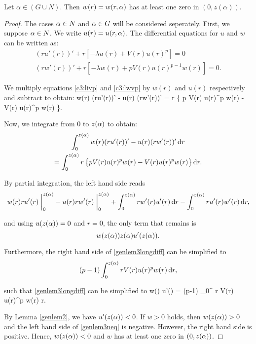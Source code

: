 \begin{lemma}\label{genlem3}
Let $\alpha\in (G\cup N).$ Then $w(r)=w(r,\alpha)$ has at least one zero in $(0,z(\alpha))$.
\end{lemma}
\begin{proof}
The cases $\alpha\in N$ and $\alpha\in G$ will be considered seperately. First, we
suppose $\alpha\in N$. We write $u(r) = u(r, \alpha)$. The differential equations for
$u$ and $w$ can be written as:
\begin{gather}
\label{c3:livp}  (ru'(r))'+r\left[-\lambda u(r)+V(r)u(r)^p\right]=0\\
\label{c3:lwvp}  (rw'(r))'+r\left[-\lambda w(r)+pV(r)u(r)^{p-1}w(r)\right]=0.
\end{gather}


We multiply equations \eqref{c3:livp} and \eqref{c3:lwvp} by $w(r)$ and $u(r)$
respectively and subtract to obtain:
\be \label{uwdiff}
    w(r) (ru'(r))' - u(r) (rw'(r))' = r \left\{ p V(r) u(r)^p w(r) - 
    V(r) u(r)^p w(r) \right\}.
\ee

Now, we integrate from $0$ to $z(\alpha)$ to obtain: 
\begin{multline} \label{genlem3longdiff}
  \int_0^{z(\alpha)}w(r)(ru'(r))'-u(r)(rw'(r))'\mathop{}\!\mathrm{d} r\\
  = \int_0^{z(\alpha)}r\left\{pV(r)u(r)^pw(r)-V(r)u(r)^pw(r)\right\}\mathop{}\!\mathrm{d} r.
\end{multline}

By partial integration, the left hand side reads
\[
w(r) r u'(r) \at_0^{\za} - u(r) r w'(r) \at_0^{\za} 
+ \int_0^{\za} r w'(r) u'(r) \diff r - \int_0^{\za} r u'(r) w'(r) \diff r,
\]

and using $u(z(\alpha)) = 0$ and $r = 0$, the only term that remains is
\[
    w(z(\alpha)) z(\alpha) u'(z(\alpha)).
\]

Furthermore, the right hand side of \eqref{genlem3longdiff} can be simplified to
\[
    (p-1) \int_0^{z(\alpha)} r V(r) u(r)^p w(r) \mathop{}\!\mathrm{d} r,
\]

such that \eqref{genlem3longdiff} can be simplified to
\be \label{genlem3neq}
w(\za) \za u'(\za) = (p-1) \int_0^{\za} r V(r) u(r)^p w(r) \diff r.
\ee

By Lemma \ref{genlem2}, we have $u'(z(\alpha)) < 0$. If $w > 0$ holds, then $w(z(\alpha)) >
0$ and the left hand side of \eqref{genlem3neq} is negative. However, the right
hand side is positive. Hence, $w(z(\alpha)) < 0$ and $w$ has at least one zero in $(0,
z(\alpha))$. 


\end{proof}
